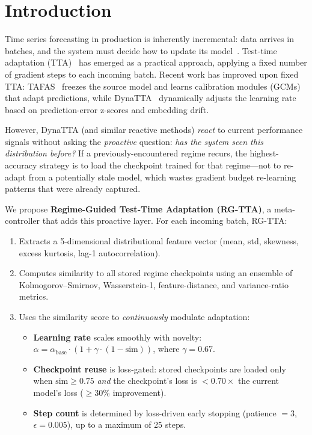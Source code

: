 \documentclass[11pt,a4paper]{article}
\begin{document}
\section{Introduction}
\label{sec:intro}

Time series forecasting in production is inherently incremental: data arrives in batches, and the system must decide how to update its model~\citep{lim2021timeseries,benidis2023deep}. Test-time adaptation (TTA)~\citep{liang2024tta} has emerged as a practical approach, applying a fixed number of gradient steps to each incoming batch. Recent work has improved upon fixed TTA: TAFAS~\citep{kim2025tafas} freezes the source model and learns calibration modules (GCMs) that adapt predictions, while DynaTTA~\citep{grover2025dynatta} dynamically adjusts the learning rate based on prediction-error z-scores and embedding drift.

However, DynaTTA (and similar reactive methods) \emph{react} to current performance signals without asking the \emph{proactive} question: \textit{has the system seen this distribution before?} If a previously-encountered regime recurs, the highest-accuracy strategy is to load the checkpoint trained for that regime---not to re-adapt from a potentially stale model, which wastes gradient budget re-learning patterns that were already captured.

We propose \textbf{Regime-Guided Test-Time Adaptation (RG-TTA)}, a meta-controller that adds this proactive layer. For each incoming batch, RG-TTA:
\begin{enumerate}[nosep]
  \item Extracts a 5-dimensional distributional feature vector (mean, std, skewness, excess kurtosis, lag-1 autocorrelation).
  \item Computes similarity to all stored regime checkpoints using an ensemble of Kolmogorov--Smirnov, Wasserstein-1, feature-distance, and variance-ratio metrics.
  \item Uses the similarity score to \emph{continuously} modulate adaptation:
  \begin{itemize}[nosep]
    \item \textbf{Learning rate} scales smoothly with novelty: $\alpha = \alpha_{\text{base}} \cdot (1 + \gamma \cdot (1 - \text{sim}))$, where $\gamma = 0.67$.
    \item \textbf{Checkpoint reuse} is loss-gated: stored checkpoints are loaded only when $\text{sim} \geq 0.75$ \emph{and} the checkpoint's loss is $< 0.70 \times$ the current model's loss ($\geq$30\% improvement).
    \item \textbf{Step count} is determined by loss-driven early stopping (patience $= 3$, $\epsilon = 0.005$), up to a maximum of 25 steps.
  \end{itemize}
\end{enumerate}
\end{document}
